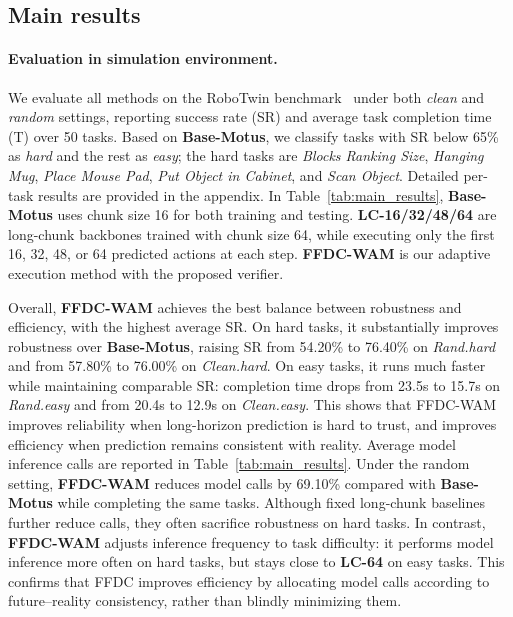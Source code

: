\documentclass{article}
\begin{document}
\subsection{Main results}
\label{sec:main_results}

\paragraph{Evaluation in simulation environment.}
We evaluate all methods on the RoboTwin benchmark~\cite{chen2025robotwin} under both \emph{clean} and \emph{random} settings, reporting success rate (SR) and average task completion time (T) over 50 tasks. Based on \textbf{Base-Motus}, we classify tasks with SR below 65\% as \emph{hard} and the rest as \emph{easy}; the hard tasks are \emph{Blocks Ranking Size}, \emph{Hanging Mug}, \emph{Place Mouse Pad}, \emph{Put Object in Cabinet}, and \emph{Scan Object}. Detailed per-task results are provided in the appendix. In Table~\ref{tab:main_results}, \textbf{Base-Motus} uses chunk size 16 for both training and testing. \textbf{LC-16/32/48/64} are long-chunk backbones trained with chunk size 64, while executing only the first 16, 32, 48, or 64 predicted actions at each step. \textbf{FFDC-WAM} is our adaptive execution method with the proposed verifier.


Overall, \textbf{FFDC-WAM} achieves the best balance between robustness and efficiency, with the highest average SR. On hard tasks, it substantially improves robustness over \textbf{Base-Motus}, raising SR from 54.20\% to 76.40\% on \emph{Rand.hard} and from 57.80\% to 76.00\% on \emph{Clean.hard}. On easy tasks, it runs much faster while maintaining comparable SR: completion time drops from 23.5s to 15.7s on \emph{Rand.easy} and from 20.4s to 12.9s on \emph{Clean.easy}. This shows that FFDC-WAM improves reliability when long-horizon prediction is hard to trust, and improves efficiency when prediction remains consistent with reality. Average model inference calls are reported in Table~\ref{tab:main_results}. Under the random setting, \textbf{FFDC-WAM} reduces model calls by 69.10\% compared with \textbf{Base-Motus} while completing the same tasks. Although fixed long-chunk baselines further reduce calls, they often sacrifice robustness on hard tasks. In contrast, \textbf{FFDC-WAM} adjusts inference frequency to task difficulty: it performs model inference more often on hard tasks, but stays close to \textbf{LC-64} on easy tasks. This confirms that FFDC improves efficiency by allocating model calls according to future--reality consistency, rather than blindly minimizing them.
\end{document}
